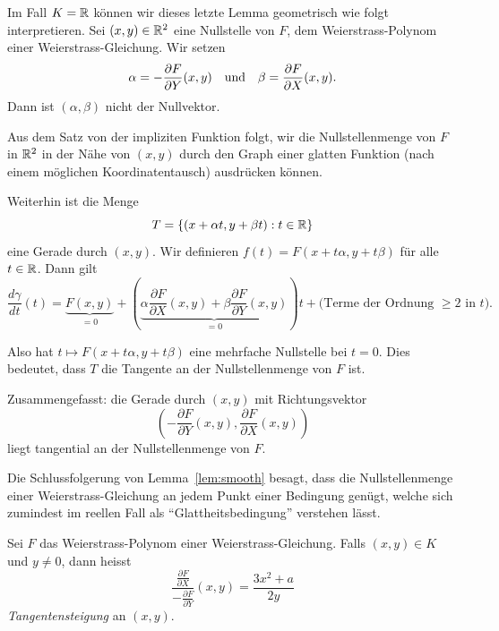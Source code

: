 \begin{bemerkung}
  \label{bem:tangente}
  Im Fall $K={\mathbb{R}}$ können wir dieses letzte Lemma geometrisch wie folgt
  interpretieren.
  Sei $(x,y)\in{\mathbb{R}}^2$ eine Nullstelle von $F$, dem Weierstrass-Polynom
  einer Weierstrass-Gleichung. Wir setzen
  $$\alpha = -\frac{\partial F}{\partial Y}(x,y) \quad\text{und}\quad
  \beta = \frac{\partial F}{\partial X}(x,y).$$
  Dann ist $(\alpha,\beta)$ nicht der Nullvektor.

  Aus dem Satz von der impliziten Funktion folgt, wir die
  Nullstellenmenge von $F$ in ${\mathbb{R}}^2$ in der Nähe von $(x,y)$ durch
  den Graph einer glatten Funktion (nach einem möglichen Koordinatentausch)
  ausdrücken können. 

  Weiterhin ist die Menge
  \begin{equation*}
    T = \{(x+\alpha t,y+\beta t) : t\in{\mathbb{R}}\}
  \end{equation*}
  eine Gerade durch $(x,y)$. Wir definieren $f(t) =
  F(x+t\alpha,y+t\beta)$ für alle $t\in{\mathbb{R}}$. 
  Dann gilt 
  \begin{equation*}
    \frac{d\gamma}{dt}(t)
    = \underbrace{F(x,y)}_{=0} + \left(\underbrace{\alpha \frac{\partial F}{\partial X}(x,y)
    +\beta \frac{\partial F}{\partial Y}(x,y)}_{=0}\right)t + \text{(Terme der
      Ordnung $\ge 2$ in $t$)}.
  \end{equation*}
  
  Also hat $t\mapsto F(x+t\alpha,y+t\beta)$ eine mehrfache Nullstelle
  bei $t=0$. Dies bedeutet, dass $T$ die Tangente an der
  Nullstellenmenge von $F$ ist.

  Zusammengefasst: die Gerade durch $(x,y)$ mit Richtungsvektor
  \begin{equation*}
    \left(-\frac{\partial F}{\partial Y}(x,y),\frac{\partial F}{\partial X}(x,y)\right)
  \end{equation*}
  liegt tangential an der Nullstellenmenge von $F$.
\end{bemerkung}

Die Schlussfolgerung von Lemma~\ref{lem:smooth} besagt, dass die
Nullstellenmenge einer Weierstrass-Gleichung an jedem Punkt einer
Bedingung genügt, welche sich zumindest im reellen Fall
als ``Glattheitsbedingung'' verstehen lässt.

\begin{definition}
  \label{def:tangentensteigung}
  Sei $F$ das Weierstrass-Polynom einer Weierstrass-Gleichung. Falls
  $(x,y)\in K$ und $y\not=0$, dann heisst
  \begin{equation*}
    \frac{\frac{\partial F}{\partial X}}{-\frac{\partial F}{\partial
        Y}}(x,y) = \frac{3x^2+a}{2y}
  \end{equation*}
  \emph{Tangentensteigung} an $(x,y)$. 
\end{definition}


